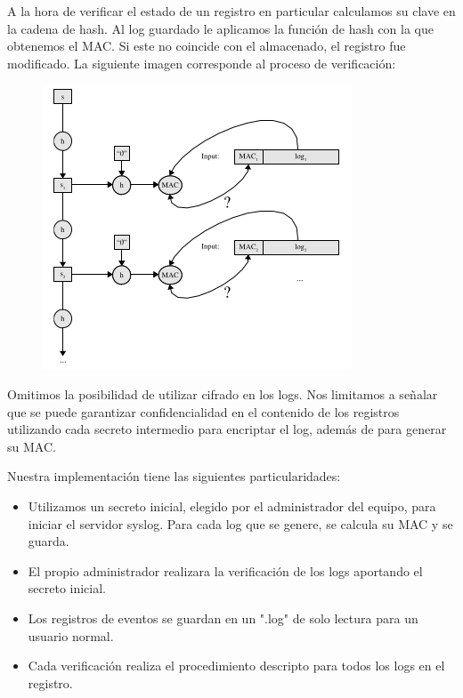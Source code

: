 A la hora de verificar el estado de un registro en particular calculamos su clave en la cadena de hash.
Al log guardado le aplicamos la función de hash con la que obtenemos el MAC. Si este no coincide con el almacenado,
el registro fue modificado. La siguiente imagen corresponde al proceso de verificación:
\begin{figure}[H]
\centering
\includegraphics[scale=1]{imagenes/Verification.png}
\end{figure}
Omitimos la posibilidad de utilizar cifrado en los logs. Nos limitamos a señalar que se puede garantizar confidencialidad en el contenido de los registros utilizando cada secreto intermedio para encriptar el log, además de para generar su MAC.

Nuestra implementación tiene las siguientes particularidades:
\begin{itemize}
\item Utilizamos un secreto inicial, elegido por el administrador del equipo, para iniciar el servidor syslog.
Para cada log que se genere, se calcula su MAC y se guarda.
\item El propio administrador realizara la verificación de los logs aportando el secreto inicial.
\item Los registros de eventos se guardan en un ".log" de solo lectura para un usuario normal.
\item Cada verificación realiza el procedimiento descripto para todos los logs en el registro.
\end{itemize}
